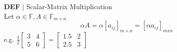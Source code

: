 \documentclass [12pt]{article}
\begin{document}
\pagebreak
\begin{framed}
\noindent\textbf{DEF} $|$ Scalar-Matrix Multiplication\\
Let $\alpha\in\mathbb{F},A\in\mathbb{F}_{m\times n}$
\[\alpha A=\alpha[a_{ij}]_{m\times n} = [\alpha a_{ij}]_{mxn}\]
e.g. $\frac{1}{2}\begin{bmatrix}
3&4\\
5&6
\end{bmatrix}=\begin{bmatrix}
1.5&2\\
2.5&3
\end{bmatrix}$
\end{framed}
\end{document}
